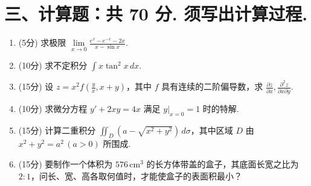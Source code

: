 \documentclass[10pt, a3paper, landscape, twocolumn]{article}
\begin{document}
\newpage 

\section*{三、计算题：共 70 分. 须写出计算过程.}

\begin{enumerate}[start=17]
    \item (5分) 求极限 $\lim\limits_{x \to 0} \frac{e^x - e^{-x} - 2x}{x - \sin x}$.
    \vspace{4cm}

    \item (10分) 求不定积分 $\int x \tan^2 x \, dx$.
    \vspace{4cm}

    \item (15分) 设 $z = x^2 f\left(\frac{y}{x}, x+y\right)$，其中 $f$ 具有连续的二阶偏导数，求 $\frac{\partial z}{\partial x}, \frac{\partial^2 z}{\partial x \partial y}$.
    \vspace{6cm}

    \item (10分) 求微分方程 $y' + 2xy = 4x$ 满足 $y|_{x=0} = 1$ 时的特解.
    \vspace{6cm}

    \item (15分) 计算二重积分 $\iint_{D} (a - \sqrt{x^2+y^2}) \, d\sigma$，其中区域 $D$ 由 $x^2 + y^2 = a^2 \, (a > 0)$ 所围成.
    \vspace{6cm}

    \item (15分) 要制作一个体积为 $576 \, \text{cm}^3$ 的长方体带盖的盒子，其底面长宽之比为 $2:1$，问长、宽、高各取何值时，才能使盒子的表面积最小？
    \vspace{6cm}
\end{enumerate}
\end{document}
